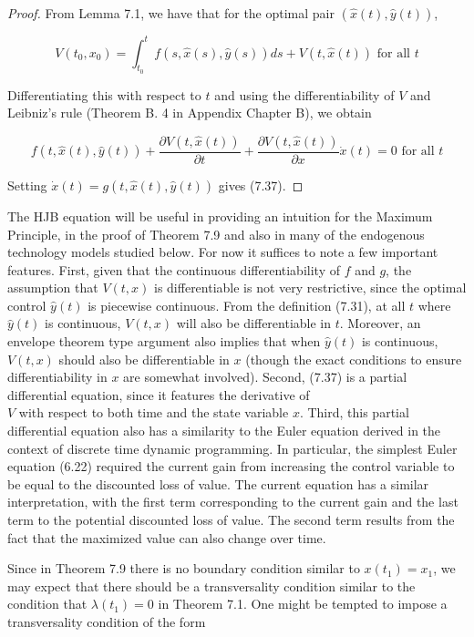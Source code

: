 \documentclass[\topdir/lecture_notes.tex]{subfiles}
\begin{document}
\begin{proof}
From Lemma 7.1, we have that for the optimal pair $(\hat{x}(t), \hat{y}(t))$,

\[
V\left(t_{0}, x_{0}\right)=\int_{t_{0}}^{t} f(s, \hat{x}(s), \hat{y}(s)) d s+V(t, \hat{x}(t)) \text { for all } t
\]

Differentiating this with respect to $t$ and using the differentiability of $V$ and Leibniz's rule (Theorem B. 4 in Appendix Chapter B), we obtain

\[
f(t, \hat{x}(t), \hat{y}(t))+\frac{\partial V(t, \hat{x}(t))}{\partial t}+\frac{\partial V(t, \hat{x}(t))}{\partial x} \dot{x}(t)=0 \text { for all } t
\]

Setting $\dot{x}(t)=g(t, \hat{x}(t), \hat{y}(t))$ gives (7.37).
\end{proof}
The HJB equation will be useful in providing an intuition for the Maximum Principle, in the proof of Theorem 7.9 and also in many of the endogenous technology models studied below. For now it suffices to note a few important features. First, given that the continuous differentiability of $f$ and $g$, the assumption that $V(t, x)$ is differentiable is not very restrictive, since the optimal control $\hat{y}(t)$ is piecewise continuous. From the definition (7.31), at all $t$ where $\hat{y}(t)$ is continuous, $V(t, x)$ will also be differentiable in $t$. Moreover, an envelope theorem type argument also implies that when $\hat{y}(t)$ is continuous, $V(t, x)$ should also be differentiable in $x$ (though the exact conditions to ensure differentiability in $x$ are somewhat involved). Second, (7.37) is a partial differential equation, since it features the derivative of\\
$V$ with respect to both time and the state variable $x$. Third, this partial differential equation also has a similarity to the Euler equation derived in the context of discrete time dynamic programming. In particular, the simplest Euler equation (6.22) required the current gain from increasing the control variable to be equal to the discounted loss of value. The current equation has a similar interpretation, with the first term corresponding to the current gain and the last term to the potential discounted loss of value. The second term results from the fact that the maximized value can also change over time.

Since in Theorem 7.9 there is no boundary condition similar to $x\left(t_{1}\right)=x_{1}$, we may expect that there should be a transversality condition similar to the condition that $\lambda\left(t_{1}\right)=0$ in Theorem 7.1. One might be tempted to impose a transversality condition of the form
\end{document}
